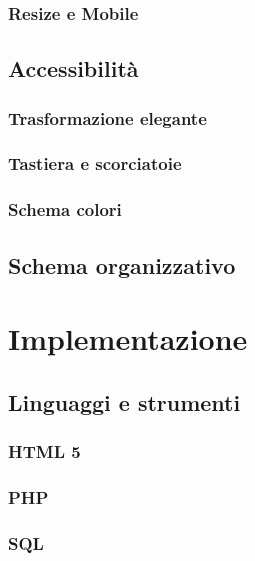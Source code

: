 \documentclass[a4paper, oneside, openany, dvipsnames, table]{article}
\begin{document}
		\subsubsection{Resize e Mobile}
			
	\subsection{Accessibilità}
		
		\subsubsection{Trasformazione elegante}
			
		\subsubsection{Tastiera e scorciatoie}
			
		\subsubsection{Schema colori}
			
	\subsection{Schema organizzativo}
		

\newpage
\section{Implementazione}
	
	\subsection{Linguaggi e strumenti}
		
		\subsubsection{HTML 5}
			
		\subsubsection{PHP}
			
		\subsubsection{SQL}
			
\end{document}
